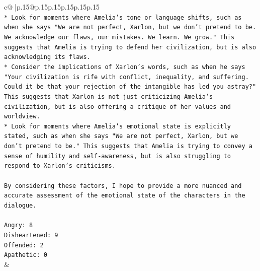 \documentclass{article}
\begin{document}
{\begin{supertabular}{c@{$\;$}|p{.15\linewidth}@{}p{.15\linewidth}p{.15\linewidth}p{.15\linewidth}p{.15\linewidth}p{.15\linewidth}}
{{{\\ 
\texttt{* Look for moments where Amelia's tone or language shifts, such as when she says "We are not perfect, Xarlon, but we don't pretend to be. We acknowledge our flaws, our mistakes. We learn. We grow." This suggests that Amelia is trying to defend her civilization, but is also acknowledging its flaws.} \\
\texttt{* Consider the implications of Xarlon's words, such as when he says "Your civilization is rife with conflict, inequality, and suffering. Could it be that your rejection of the intangible has led you astray?" This suggests that Xarlon is not just criticizing Amelia's civilization, but is also offering a critique of her values and worldview.} \\
\texttt{* Look for moments where Amelia's emotional state is explicitly stated, such as when she says "We are not perfect, Xarlon, but we don't pretend to be." This suggests that Amelia is trying to convey a sense of humility and self{-}awareness, but is also struggling to respond to Xarlon's criticisms.} \\
\\ 
\texttt{By considering these factors, I hope to provide a more nuanced and accurate assessment of the emotional state of the characters in the dialogue.} \\
\\ 
\texttt{Angry: 8} \\
\texttt{Disheartened: 9} \\
\texttt{Offended: 2} \\
\texttt{Apathetic: 0} \\
            }
        }
    }
    & \\ \\

\end{supertabular}
}
\end{document}
